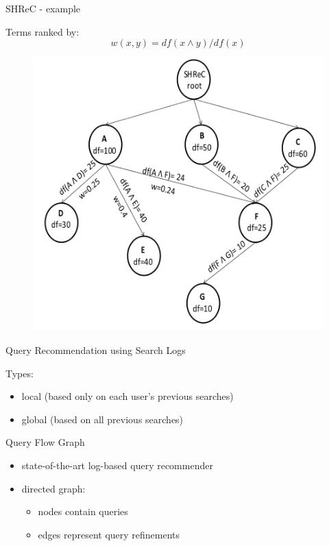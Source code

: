 \begin{frame}{SHReC - example}

Terms ranked by:
\[
	w(x, y) = df(x \land y) / df(x)
\]

\begin{figure}
	\includegraphics[scale=0.4]{img/SHReC-Example.png}
\end{figure}

\end{frame}


\begin{frame}{Query Recommendation using Search Logs}

Types:
\begin{itemize}
	\item local (based only on each user's previous searches)
	\item global (based on all previous searches) \newline
\end{itemize}

Query Flow Graph
\begin{itemize}
	\item state-of-the-art log-based query recommender
	\item directed graph:
		\begin{itemize}
			\item nodes contain queries
			\item edges represent query refinements 
		\end{itemize}
\end{itemize}

\end{frame}


